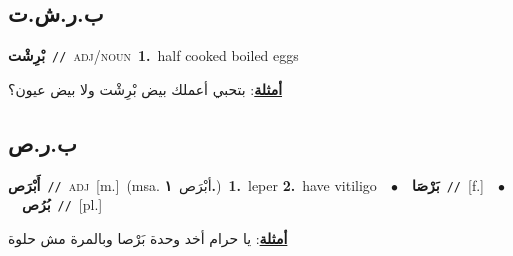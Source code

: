 \documentclass[10pt,a4paper,twoside]{article} %
\begin{document}
\begin{multicols}{2}
\vspace{-3mm}
\subsection*{\color{blue}\foreignlanguage{arabic}{ب.ر.ش.ت}\color{blue}{ (ntws)}} 

{\setlength\topsep{0pt}\textbf{\foreignlanguage{arabic}{بْرِشْت}}\ {\color{gray}\texttt{//}\color{black}}\ \textsc{adj/noun}\ \textbf{1.}~half cooked boiled eggs\  \begin{flushright}\color{gray}\foreignlanguage{arabic}{\textbf{\underline{\foreignlanguage{arabic}{أمثلة}}}: بتحبي أعملك بيض بْرِشْت ولا بيض عيون؟}\end{flushright}\color{black}} \vspace{2mm}

\vspace{-3mm}
\subsection*{\color{blue}\foreignlanguage{arabic}{ب.ر.ص}\color{blue}{}} 

{\setlength\topsep{0pt}\textbf{\foreignlanguage{arabic}{أَبْرَص}}\ {\color{gray}\texttt{//}\color{black}}\ \textsc{adj}\ [m.]\ \color{gray}(msa. \foreignlanguage{arabic}{أبْرَص}~\foreignlanguage{arabic}{\textbf{١.}})\color{black}\ \textbf{1.}~leper  \textbf{2.}~have vitiligo\ \ $\bullet$\ \ \setlength\topsep{0pt}\textbf{\foreignlanguage{arabic}{بَرْصَا}}\ {\color{gray}\texttt{//}\color{black}}\ [f.]\ \ $\bullet$\ \ \setlength\topsep{0pt}\textbf{\foreignlanguage{arabic}{بُرُص}}\ {\color{gray}\texttt{//}\color{black}}\ [pl.]\  \begin{flushright}\color{gray}\foreignlanguage{arabic}{\textbf{\underline{\foreignlanguage{arabic}{أمثلة}}}: يا حرام أخد وحدة بَرْصا وبالمرة مش حلوة}\end{flushright}\color{black}} \vspace{2mm}


\end{multicols}
\end{document}
